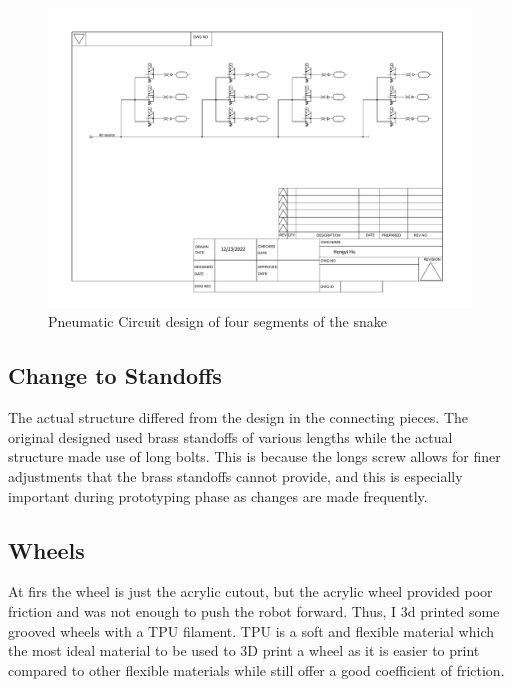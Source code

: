 \documentclass[twoside]{article}
\begin{document}
\begin{figure} [H]
	\centering
	\includegraphics[width=\linewidth]{pneumatic circuit design}
	\caption{Pneumatic Circuit design of four segments of the snake}
\end{figure}

\subsection{Change to Standoffs}
The actual structure differed from the design in the connecting pieces. The original designed used brass standoffs of various lengths while the actual structure made use of long bolts. This is because the longs screw allows for finer adjustments that the brass standoffs cannot provide, and this is especially important during prototyping phase as changes are made frequently. 

\subsection{Wheels}
At firs the wheel is just the acrylic cutout, but the acrylic wheel provided poor friction and was not enough to push the robot forward. Thus, I 3d printed some grooved wheels with a TPU filament. TPU is a soft and flexible material which the most ideal material to be used to 3D print a wheel as it is easier to print compared to other flexible materials while still offer a good coefficient of friction. 
\end{document}
